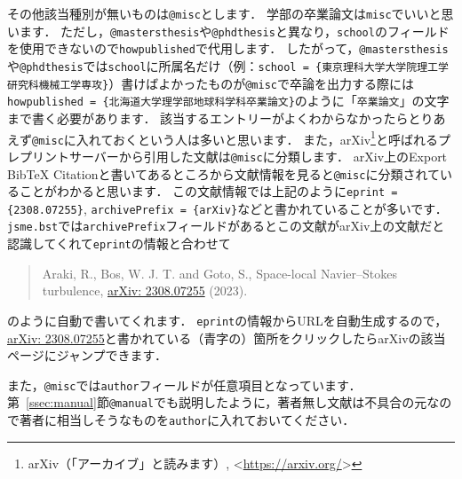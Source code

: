 \documentclass[a4paper,fleqn,uplatex,dvipdfmx]{jsarticle}
\newcommand{\jsmefile}{\texttt{jsme.bst}}
\begin{document}
その他該当種別が無いものは\verb|@misc|とします．
学部の卒業論文は\verb|misc|でいいと思います．
ただし，\verb|@mastersthesis|や\verb|@phdthesis|と異なり，\verb|school|のフィールドを使用できないので\verb|howpublished|で代用します．
したがって，\verb|@mastersthesis|や\verb|@phdthesis|では\verb|school|に所属名だけ（例：\verb|school = {東京理科大学大学院理工学研究科機械工学専攻}|）書けばよかったものが\verb|@misc|で卒論を出力する際には\verb|howpublished = {北海道大学理学部地球科学科卒業論文}|のように「\verb|卒業論文|」の文字まで書く必要があります．
該当するエントリーがよくわからなかったらとりあえず\verb|@misc|に入れておくという人は多いと思います．
また，arXiv\footnote{arXiv（「アーカイブ」と読みます）, \textless\url{https://arxiv.org/}\textgreater}と呼ばれるプレプリントサーバーから引用した文献は\verb|@misc|に分類します．
arXiv上のExport BibTeX Citationと書いてあるところから文献情報を見ると\verb|@misc|に分類されていることがわかると思います．
この文献情報では上記のように\verb|eprint = {2308.07255}|, \verb|archivePrefix = {arXiv}|などと書かれていることが多いです．
\jsmefile では\verb|archivePrefix|フィールドがあるとこの文献がarXiv上の文献だと認識してくれて\verb|eprint|の情報と合わせて
\begin{quote}
    Araki, R., Bos, W. J. T. and Goto, S., Space-local Navier--Stokes turbulence, \href{https://doi.org/10.48550/arXiv.2308.07255}{arXiv: 2308.07255} (2023).
\end{quote}
のように自動で書いてくれます．
\verb|eprint|の情報からURLを自動生成するので，\href{https://doi.org/10.48550/arXiv.2308.07255}{arXiv: 2308.07255}と書かれている（青字の）箇所をクリックしたらarXivの該当ページにジャンプできます．

また，\verb|@misc|では\verb|author|フィールドが任意項目となっています．
第~\ref{ssec:manual}節\verb|@manual|でも説明したように，著者無し文献は不具合の元なので著者に相当しそうなものを\verb|author|に入れておいてください．
\end{document}
